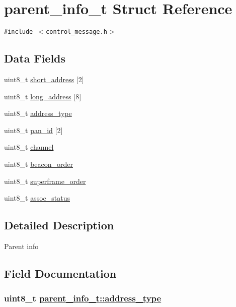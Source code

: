 \hypertarget{structparent__info__t}{
\section{parent\_\-info\_\-t Struct Reference}
\label{structparent__info__t}
}
{\tt \#include $<$control\_\-message.h$>$}

\subsection*{Data Fields}
\begin{CompactItemize}
\item 
uint8\_\-t \hyperlink{structparent__info__t_463aef8b654047f66e65fbeaa0d7d998}{short\_\-address} \mbox{[}2\mbox{]}
\item 
uint8\_\-t \hyperlink{structparent__info__t_52ebeb2739e698a13dead67e3482ad7d}{long\_\-address} \mbox{[}8\mbox{]}
\item 
uint8\_\-t \hyperlink{structparent__info__t_a24d5c0413f399c3bd425b5890305ecd}{address\_\-type}
\item 
uint8\_\-t \hyperlink{structparent__info__t_2138f2dfdfb2427df926d5afa8325408}{pan\_\-id} \mbox{[}2\mbox{]}
\item 
uint8\_\-t \hyperlink{structparent__info__t_d72715c9782a3187d18476f0b83218f2}{channel}
\item 
uint8\_\-t \hyperlink{structparent__info__t_c81216fe7fa10fa4c5795b8232f83693}{beacon\_\-order}
\item 
uint8\_\-t \hyperlink{structparent__info__t_1051ff5dc2cd27378496f5d4beb1ed1a}{superframe\_\-order}
\item 
uint8\_\-t \hyperlink{structparent__info__t_e80be53cbd7445e949750ba876bb58d4}{assoc\_\-status}
\end{CompactItemize}


\subsection{Detailed Description}
Parent info 



\subsection{Field Documentation}
\hypertarget{structparent__info__t_a24d5c0413f399c3bd425b5890305ecd}{
\subsubsection[address\_\-type]{\setlength{\rightskip}{0pt plus 5cm}uint8\_\-t \hyperlink{structparent__info__t_a24d5c0413f399c3bd425b5890305ecd}{parent\_\-info\_\-t::address\_\-type}}}
\label{structparent__info__t_a24d5c0413f399c3bd425b5890305ecd}


